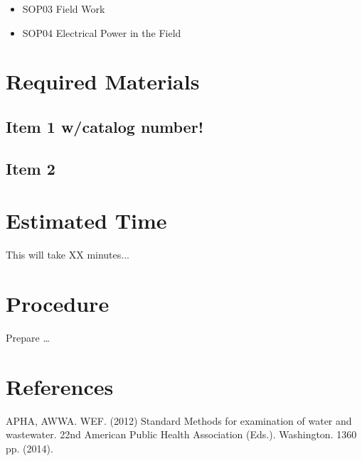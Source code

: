 \documentclass[12pt]{../SOP3_beta}
\begin{document}
\begin{itemize}
  \item SOP03 Field Work
  \item SOP04 Electrical Power in the Field
\end{itemize}

\section{Required Materials}

\subsection{Item 1 w/catalog number!}
\subsection{Item 2}

\section{Estimated Time}

\NP This will take XX minutes...

\section{Procedure}

\NP Prepare \dots

\NP

\section{References}

\NP APHA, AWWA. WEF. (2012) Standard Methods for examination of water and wastewater. 22nd American Public Health Association (Eds.). Washington. 1360 pp. (2014).
\end{document}
